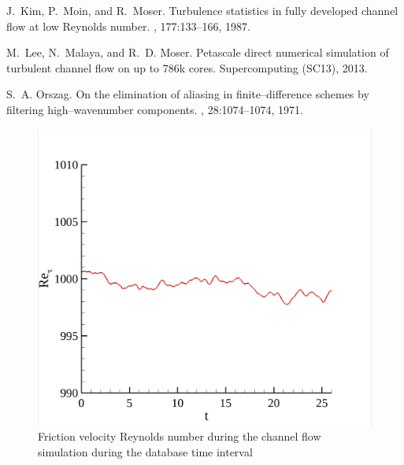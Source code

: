 \documentclass[11pt,letterpaper]{article}
\begin{document}

%
\begin{thebibliography}{1}

J.~Kim, P.~Moin, and R.~Moser.
\newblock Turbulence statistics in fully developed channel flow at low Reynolds
  number.
, 177:133--166, 1987.

M.~Lee, N.~Malaya, and R.~D. Moser.
\newblock Petascale direct numerical simulation of turbulent channel flow on up
  to 786k cores.
\newblock Supercomputing (SC13), 2013.

S.~A. Orszag.
\newblock On the elimination of aliasing in finite--difference schemes by
  filtering high--wavenumber components.
, 28:1074--1074, 1971.

\end{thebibliography}

\newpage

\begin{figure}[h]
  \centering
  \includegraphics[width=5.00in]{./figures/re_tau.png}
 \caption{Friction velocity Reynolds number during the channel flow simulation during the database time interval}
 \label{fig:re_tau}
\end{figure}
\end{document}
